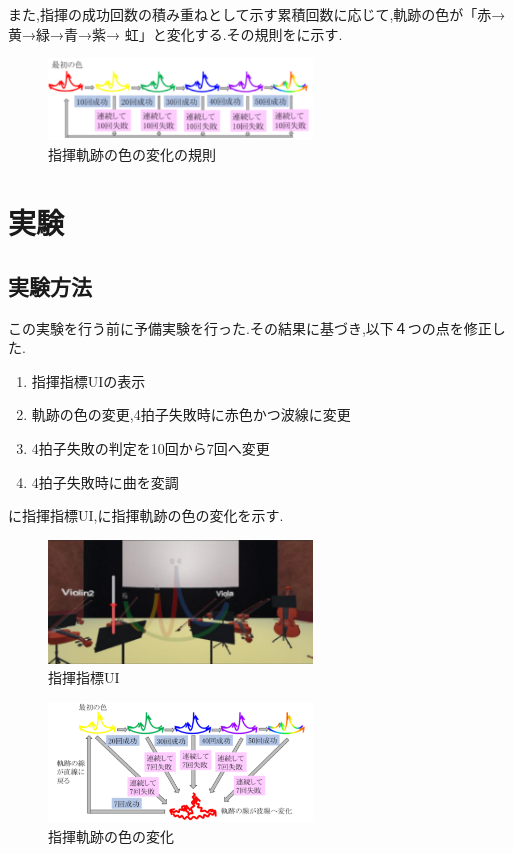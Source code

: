 \documentclass[uplatex]{jsarticle}   %
\begin{document}
また,指揮の成功回数の積み重ねとして示す累積回数に応じて,軌跡の色が「赤→黄→緑→青→紫→ 虹」と変化する.その規則をに示す.

\begin{figure}[t]
 \centering
 \includegraphics[clip,width=7cm]{sikisikumi.png}
 \caption{指揮軌跡の色の変化の規則}\label{fig:hoge}
\end{figure}


\section{実験}
\subsection{実験方法}
この実験を行う前に予備実験を行った.その結果に基づき,以下４つの点を修正した.
\begin{enumerate}
\item 指揮指標UIの表示
\item 軌跡の色の変更,4拍子失敗時に赤色かつ波線に変更
\item 4拍子失敗の判定を10回から7回へ変更
\item 4拍子失敗時に曲を変調
\end{enumerate}

に指揮指標UI,に指揮軌跡の色の変化を示す.

\begin{figure}[b]
 \centering
 \includegraphics[clip,width=7cm]{sikiUI.png}
 \caption{指揮指標UI}\label{fig:UI}
\end{figure}

\begin{figure}[b]
 \centering
 \includegraphics[clip,width=7cm]{kisekihenka.png}
 \caption{指揮軌跡の色の変化}\label{fig:henka}
\end{figure}
\end{document}
